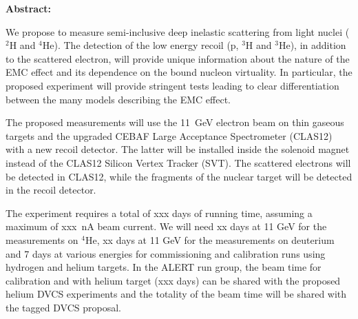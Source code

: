 {\large\textbf{Abstract:}}

We propose to measure semi-inclusive deep inelastic scattering from light nuclei ($^2$H and $^4$He). The detection of the low energy recoil (p, $^3$H and $^3$He), in addition to the scattered electron, will provide unique information about the nature of the EMC effect and its dependence on the bound nucleon virtuality. In particular, the proposed experiment will provide stringent tests leading to clear differentiation between the many models describing the EMC effect.

The proposed measurements will use the 11~GeV electron beam on thin gaseous targets and the upgraded CEBAF Large Acceptance Spectrometer (CLAS12) with a new recoil detector. The latter will be installed inside the solenoid magnet instead of the CLAS12 Silicon Vertex Tracker (SVT). The scattered electrons will be detected in CLAS12, while the fragments of the nuclear target will be detected in the recoil detector. 

The experiment requires a total of xxx days of running time, assuming a maximum of xxx~nA beam current. We will need xx days at 11 GeV for the measurements on $^4$He, xx days at 11 GeV for the measurements on deuterium and 7 days at various energies for commissioning and calibration runs using hydrogen and helium targets. In the ALERT run group, the beam time for calibration and with helium target (xxx days) can be shared with the proposed helium DVCS experiments and the totality of the beam time will be shared with the tagged DVCS proposal.


\newpage

